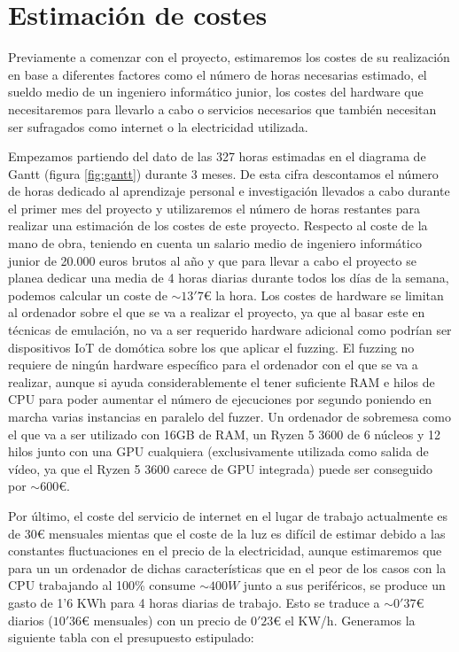 \section{Estimación de costes}
Previamente a comenzar con el proyecto, estimaremos los costes de su realización en base a diferentes factores como el número de horas necesarias
estimado, el sueldo medio de un ingeniero informático junior, los costes del hardware que necesitaremos para llevarlo a cabo o servicios necesarios
que también necesitan ser sufragados como internet o la electricidad utilizada.\bigskip

Empezamos partiendo del dato de las 327 horas estimadas en el diagrama de Gantt (figura \ref{fig:gantt}) durante 3 meses.
De esta cifra descontamos el número de horas dedicado al aprendizaje personal e investigación llevados a cabo durante el primer mes del
proyecto y utilizaremos el número de horas restantes para realizar una estimación de los costes de este proyecto. Respecto al coste de la 
mano de obra, teniendo en cuenta un 
salario medio de ingeniero informático junior de 20.000 euros brutos al año y que para llevar a cabo el proyecto se planea dedicar una media de 
4 horas diarias durante todos los días de la semana, podemos calcular un coste de $\sim13'7\euro$ la hora. Los costes de hardware se limitan al
ordenador sobre el que se va a realizar el proyecto, ya que al basar este en técnicas de emulación, no va a ser requerido hardware adicional 
como podrían ser dispositivos IoT de domótica sobre los que aplicar el fuzzing. El fuzzing no requiere de ningún hardware específico para el 
ordenador con el que se va a realizar, aunque si ayuda considerablemente el tener suficiente RAM e hilos de CPU para poder aumentar el número de ejecuciones por segundo 
poniendo en marcha varias instancias en paralelo del fuzzer. Un ordenador de sobremesa como el que va a ser utilizado con 16GB de RAM, un 
Ryzen 5 3600 de 6 núcleos y 12 hilos junto con una GPU cualquiera (exclusivamente utilizada como salida de vídeo, ya que el Ryzen 5 3600 carece de GPU integrada) puede ser
conseguido por $\sim600\euro$.\bigskip

Por último, el coste del servicio de internet en el lugar de trabajo actualmente es de $30\euro$ mensuales mientas 
que el coste de la luz es difícil de estimar debido a las constantes fluctuaciones en el precio de la electricidad, aunque estimaremos que 
para un un ordenador de dichas características que en el peor de los casos con la CPU trabajando al 100\% consume $\sim400W$ junto a sus 
periféricos, se produce un gasto de 1'6 KWh para 4 horas diarias de trabajo. Esto se traduce a $\sim0'37\euro$ diarios ($10'36\euro$ mensuales)
con un precio de $0'23\euro$ el KW/h. Generamos la siguiente tabla con el presupuesto estipulado:

